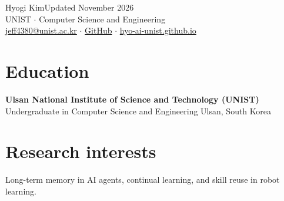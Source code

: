 \documentclass[10pt,a4paper]{article}
\begin{document}
{\Huge Hyogi Kim}\hfill {\small Updated November 2026}\\[5pt]
UNIST $\cdot$ Computer Science and Engineering\\
\href{mailto:jeff4380@unist.ac.kr}{jeff4380@unist.ac.kr} $\cdot$ \href{https://github.com/HYO-AI-UNIST}{GitHub} $\cdot$ \href{https://hyo-ai-unist.github.io}{hyo-ai-unist.github.io}
\section{Education}
\textbf{Ulsan National Institute of Science and Technology (UNIST)}\\
Undergraduate in Computer Science and Engineering \hfill Ulsan, South Korea
\section{Research interests}
Long-term memory in AI agents, continual learning, and skill reuse in robot learning.
\end{document}
